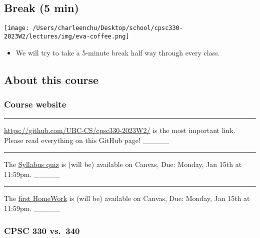 \documentclass[11pt]{article}
\providecommand{\tightlist}{%
      \setlength{\itemsep}{0pt}\setlength{\parskip}{0pt}}
\begin{document}
    

    

    \subsection{Break (5 min)}\label{break-5-min}

\texttt{[image: /Users/charleenchu/Desktop/school/cpsc330-2023W2/lectures/img/eva-coffee.png]}

\begin{itemize}
\tightlist
\item
  We will try to take a 5-minute break half way through every class.
\end{itemize}

    

    \subsection{About this course}\label{about-this-course}

    \subsubsection{Course website}\label{course-website}

    \begin{center}\rule{0.5\linewidth}{0.5pt}\end{center}

\url{https://github.com/UBC-CS/cpsc330-2023W2/} is the most important
link. Please read everything on this GitHub page! \_\_\_\_\_

    \begin{center}\rule{0.5\linewidth}{0.5pt}\end{center}

The \href{https://canvas.ubc.ca/courses/123439/quizzes}{Syllabus quiz}
is (will be) available on Canvas, Due: Monday, Jan 15th at 11:59pm.
\_\_\_\_\_

    \begin{center}\rule{0.5\linewidth}{0.5pt}\end{center}

The \href{}{first HomeWork} is (will be) available on Canvas, Due:
Monday, Jan 15th at 11:59pm. \_\_\_\_\_

    \subsubsection{CPSC 330 vs.~340}\label{cpsc-330-vs.-340}
\end{document}
